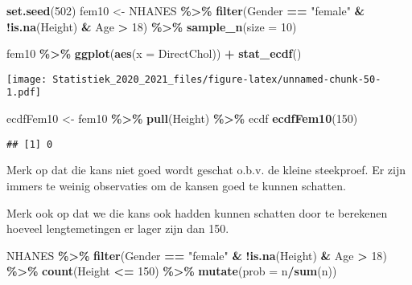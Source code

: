 \documentclass[
  12pt,dutch,coursenotes]{book}
\newenvironment{Shaded}{\begin{snugshade}}{\end{snugshade}}
\newcommand{\DataTypeTok}[1]{\textcolor[rgb]{0.13,0.29,0.53}{#1}}
\newcommand{\DecValTok}[1]{\textcolor[rgb]{0.00,0.00,0.81}{#1}}
\newcommand{\KeywordTok}[1]{\textcolor[rgb]{0.13,0.29,0.53}{\textbf{#1}}}
\newcommand{\NormalTok}[1]{#1}
\newcommand{\OperatorTok}[1]{\textcolor[rgb]{0.81,0.36,0.00}{\textbf{#1}}}
\newcommand{\StringTok}[1]{\textcolor[rgb]{0.31,0.60,0.02}{#1}}
\theoremstyle{definition}
\theoremstyle{definition}
\theoremstyle{definition}
\theoremstyle{remark}
\begin{document}
\begin{Shaded}
\begin{Highlighting}[]
\KeywordTok{set.seed}\NormalTok{(}\DecValTok{502}\NormalTok{)}
\NormalTok{fem10 \textless{}{-}}\StringTok{ }\NormalTok{NHANES }\OperatorTok{\%\textgreater{}\%}\StringTok{ }\KeywordTok{filter}\NormalTok{(Gender }\OperatorTok{==}\StringTok{ "female"} \OperatorTok{\&}\StringTok{ }\OperatorTok{!}\KeywordTok{is.na}\NormalTok{(Height) }\OperatorTok{\&}\StringTok{ }
\StringTok{    }\NormalTok{Age }\OperatorTok{\textgreater{}}\StringTok{ }\DecValTok{18}\NormalTok{) }\OperatorTok{\%\textgreater{}\%}\StringTok{ }\KeywordTok{sample\_n}\NormalTok{(}\DataTypeTok{size =} \DecValTok{10}\NormalTok{)}

\NormalTok{fem10 }\OperatorTok{\%\textgreater{}\%}\StringTok{ }\KeywordTok{ggplot}\NormalTok{(}\KeywordTok{aes}\NormalTok{(}\DataTypeTok{x =}\NormalTok{ DirectChol)) }\OperatorTok{+}\StringTok{ }\KeywordTok{stat\_ecdf}\NormalTok{()}
\end{Highlighting}
\end{Shaded}

\texttt{[image: Statistiek\_2020\_2021\_files/figure-latex/unnamed-chunk-50-1.pdf]}

\begin{Shaded}
\begin{Highlighting}[]
\NormalTok{ecdfFem10 \textless{}{-}}\StringTok{ }\NormalTok{fem10 }\OperatorTok{\%\textgreater{}\%}\StringTok{ }\KeywordTok{pull}\NormalTok{(Height) }\OperatorTok{\%\textgreater{}\%}\StringTok{ }\NormalTok{ecdf}
\KeywordTok{ecdfFem10}\NormalTok{(}\DecValTok{150}\NormalTok{)}
\end{Highlighting}
\end{Shaded}

\begin{verbatim}
## [1] 0
\end{verbatim}

Merk op dat die kans niet goed wordt geschat o.b.v. de kleine steekproef. Er zijn immers te weinig observaties om de kansen goed te kunnen schatten.

Merk ook op dat we die kans ook hadden kunnen schatten door te berekenen hoeveel lengtemetingen er lager zijn dan 150.

\begin{Shaded}
\begin{Highlighting}[]
\NormalTok{NHANES }\OperatorTok{\%\textgreater{}\%}\StringTok{ }\KeywordTok{filter}\NormalTok{(Gender }\OperatorTok{==}\StringTok{ "female"} \OperatorTok{\&}\StringTok{ }\OperatorTok{!}\KeywordTok{is.na}\NormalTok{(Height) }\OperatorTok{\&}\StringTok{ }
\StringTok{    }\NormalTok{Age }\OperatorTok{\textgreater{}}\StringTok{ }\DecValTok{18}\NormalTok{) }\OperatorTok{\%\textgreater{}\%}\StringTok{ }\KeywordTok{count}\NormalTok{(Height }\OperatorTok{\textless{}=}\StringTok{ }\DecValTok{150}\NormalTok{) }\OperatorTok{\%\textgreater{}\%}\StringTok{ }\KeywordTok{mutate}\NormalTok{(}\DataTypeTok{prob =}\NormalTok{ n}\OperatorTok{/}\KeywordTok{sum}\NormalTok{(n))}
\end{Highlighting}
\end{Shaded}
\end{document}
